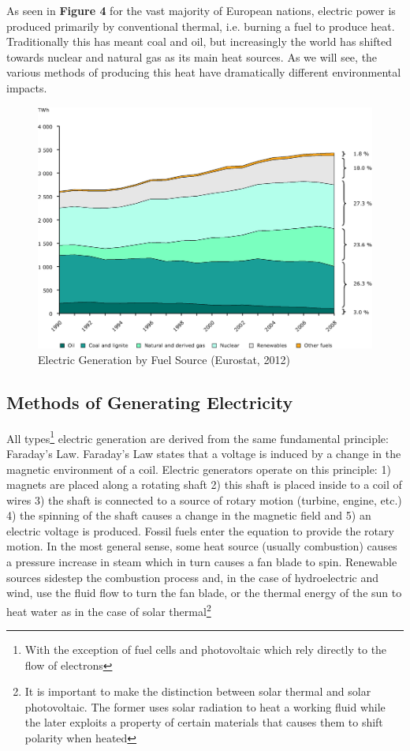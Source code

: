 \documentclass{article}
\begin{document}
As seen in {\bf Figure 4} for the vast majority of European nations, electric power is produced primarily by conventional thermal, i.e. burning a fuel to produce heat. Traditionally this has meant coal and oil, but increasingly the world has shifted towards nuclear and natural gas as its main heat sources. As we will see, the various methods of producing this heat have dramatically different environmental impacts. 

\begin{figure}[H]
	\begin{center}
	\includegraphics[scale = .5]{Figures/sourceTWh.png}
	\caption{Electric Generation by Fuel Source (Eurostat, 2012)}
	\end{center}
\end{figure}

\subsection{Methods of Generating Electricity}
All types\footnote{With the exception of fuel cells and photovoltaic which rely directly to the flow of electrons} electric generation are derived from the same fundamental principle: Faraday's Law. Faraday’s Law states that a voltage is induced by a change in the magnetic environment of a coil. Electric generators operate on this principle: 1) magnets are placed along a rotating shaft 2) this shaft is placed inside to a coil of wires 3) the shaft is connected to a source of rotary motion (turbine, engine, etc.) 4) the spinning of the shaft causes a change in the magnetic field and 5) an electric voltage is produced. Fossil fuels enter the equation to provide the rotary motion. In the most general sense, some heat source (usually combustion) causes a pressure increase in steam which in turn causes a fan blade to spin. Renewable sources sidestep the combustion process and, in the case of hydroelectric and wind, use the fluid flow to turn the fan blade, or the thermal energy of the sun to heat water as in the case of solar thermal\footnote{It is important to make the distinction between solar thermal and solar photovoltaic. The former uses solar radiation to heat a working fluid while the later exploits a property of certain materials that causes them to shift polarity when heated}\*
\end{document}
